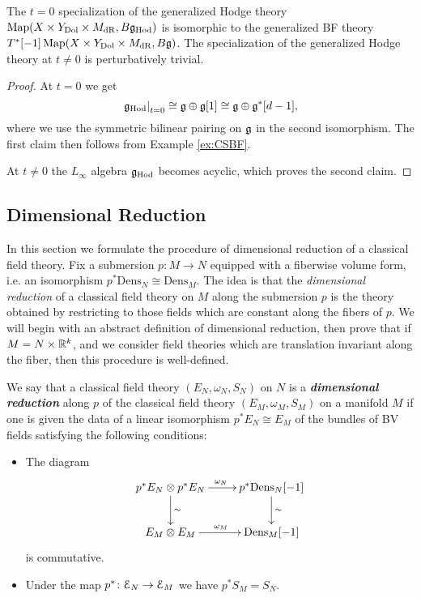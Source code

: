 \documentclass[10pt, oneside]{article}
\newcommand{\Dens}{\mathrm{Dens}}
\newcommand{\Hod}{\mathrm{Hod}}
\newcommand{\defterm}[1]{\textbf{\emph{#1}}}
\begin{document}
\begin{prop}
The $t=0$ specialization of the generalized Hodge theory $\map(X\times Y_{\mr{Dol}}\times M_{\mr{dR}}, B \fg_\Hod)$ is isomorphic to the generalized BF theory $T^*[-1]\operatorname{Map}(X\times Y_{\mathrm{Dol}}\times M_{\mathrm{dR}}, B \mathfrak g)$. The specialization of the generalized Hodge theory at $t\neq 0$ is perturbatively trivial.
\label{prop:Hodgetheoryspecialization}
\end{prop}

\begin{proof}
At $t=0$ we get
\[\left.\fg_\Hod\right|_{t=0}\cong \fg\oplus \fg[1]\cong \fg\oplus \fg^*[d-1],\]
where we use the symmetric bilinear pairing on $\mathfrak g$ in the second isomorphism. The first claim then follows from Example \ref{ex:CSBF}.

At $t\neq 0$ the $L_\infty$ algebra $\fg_\Hod$ becomes acyclic, which proves the second claim.
\end{proof}

\subsection{Dimensional Reduction} \label{dim_red_section}

In this section we formulate the procedure of dimensional reduction of a classical field theory. Fix a submersion $p\colon M\rightarrow N$ equipped with a fiberwise volume form, i.e. an isomorphism $p^*\Dens_N\cong \Dens_M$.  The idea is that the \emph{dimensional reduction} of a classical field theory on $M$ along the submersion $p$ is the theory obtained by restricting to those fields which are constant along the fibers of $p$.  We will begin with an abstract definition of dimensional reduction, then prove that if $M = N \times \mathbb R^k$, and we consider field theories which are translation invariant along the fiber, then this procedure is well-defined.

\begin{definition}
We say that a classical field theory $(E_N, \omega_N, S_N)$ on $N$ is a \defterm{dimensional reduction} along $p$ of the classical field theory $(E_M, \omega_M, S_M)$ on a manifold $M$ if one is given the data of a linear isomorphism $p^* E_N\cong E_M$ of the bundles of BV fields satisfying the following conditions:
\begin{itemize}
\item The diagram
\[
\xymatrix{
p^* E_N\otimes p^* E_N \ar^{\omega_N}[r] \ar^{\sim}[d] & p^*\Dens_N[-1] \ar^{\sim}[d] \\
E_M\otimes E_M \ar^{\omega_M}[r] & \Dens_M[-1]
}
\]
is commutative.

\item Under the map $p^*\colon \mathcal E_N\rightarrow \mathcal E_M$ we have $p^* S_M = S_N$.
\end{itemize}
\end{definition}
\end{document}
